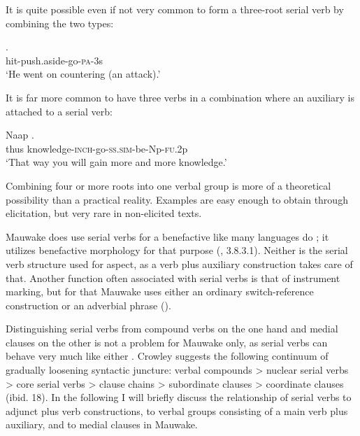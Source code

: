 It is quite possible even if not very common to form a three-root serial verb by combining the two types:

\ea%
\label{ex:3:x385}
\gll {}. \\
hit-push.aside-go-\textsc{pa}-3s \\
\glt`He went on countering (an attack).'
\z

It is far more common to have three verbs in a combination where an auxiliary is attached to a serial verb:

\ea%
\label{ex:3:x386}
\gll Naap . \\
thus knowledge-\textsc{inch}-go-\textsc{ss}.\textsc{sim}-be-Np-\textsc{fu}.2p \\
\glt`That way you will gain more and more knowledge.'
\z

Combining four or more roots into one verbal group is more of a theoretical possibility than a practical reality. Examples are easy enough to obtain through elicitation, but very rare in non-elicited texts.

Mauwake does  use serial verbs for a benefactive like many languages do \citep[174--80]{Sebba1987}; it utilizes benefactive morphology for that purpose (, 3.8.3.1). Neither is the serial verb structure used for aspect, as a verb plus auxiliary construction takes care of that. Another function often associated with serial verbs is that of instrument marking, but for that Mauwake uses either an ordinary switch-reference construction or an adverbial phrase ().

Distinguishing serial verbs from compound verbs on the one hand and medial clauses on the other is not a problem for Mauwake only, as serial verbs can behave very much like either \citep[17]{Crowley2002}. Crowley suggests the following continuum of gradually loosening syntactic juncture: verbal compounds {{\textgreater}} nuclear serial verbs {{\textgreater}} core serial verbs {{\textgreater}} clause chains {{\textgreater}} subordinate clauses {{\textgreater}} coordinate clauses (ibid. 18). In the following I will briefly discuss the relationship of serial verbs to adjunct plus verb constructions, to verbal groups consisting of a main verb plus auxiliary, and to medial clauses in Mauwake. 


